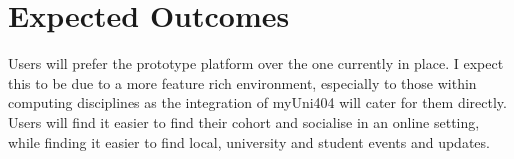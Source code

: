 \documentclass[lettersize,journal]{IEEEtran}
\begin{document}
\section{Expected Outcomes}
 Users will prefer the prototype platform over the one currently in place. I expect this to be due to a more feature rich environment, 
 especially to those within computing disciplines as the integration of myUni404 will cater for them directly. Users will find it easier to find their 
 cohort and socialise in an online setting, while finding it easier to find local, university and student events and updates.





%
%
%
\end{document}
